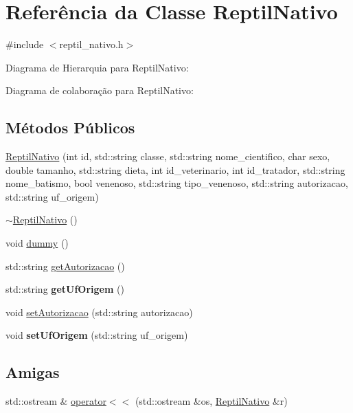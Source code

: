\hypertarget{classReptilNativo}{}\section{Referência da Classe Reptil\+Nativo}
\label{classReptilNativo}


{\ttfamily \#include $<$reptil\+\_\+nativo.\+h$>$}



Diagrama de Hierarquia para Reptil\+Nativo\+:


Diagrama de colaboração para Reptil\+Nativo\+:
\subsection*{Métodos Públicos}
\begin{DoxyCompactItemize}
\item 
\hyperlink{classReptilNativo_ab23dadfa1a143b980b0b0a8d16ff0d05}{Reptil\+Nativo} (int id, std\+::string classe, std\+::string nome\+\_\+cientifico, char sexo, double tamanho, std\+::string dieta, int id\+\_\+veterinario, int id\+\_\+tratador, std\+::string nome\+\_\+batismo, bool venenoso, std\+::string tipo\+\_\+venenoso, std\+::string autorizacao, std\+::string uf\+\_\+origem)
\item 
\hyperlink{classReptilNativo_a6de5838fd62a1c61175e690110cd7dc0}{$\sim$\+Reptil\+Nativo} ()
\item 
void \hyperlink{classReptilNativo_a72582fd1adb5d8d562354ab35e574b3b}{dummy} ()
\item 
std\+::string \hyperlink{classReptilNativo_af3526f4d89e275985983ac6a76e02fc4}{get\+Autorizacao} ()
\item 
\mbox{\label{classReptilNativo_ad4b80b0971aac643e42476292d02a9c1}} 
std\+::string {\bfseries get\+Uf\+Origem} ()
\item 
void \hyperlink{classReptilNativo_a18648a093476229d68a57d45d749d69c}{set\+Autorizacao} (std\+::string autorizacao)
\item 
\mbox{\label{classReptilNativo_a2c49cbeec06abf746fc6f62d8dce49a0}} 
void {\bfseries set\+Uf\+Origem} (std\+::string uf\+\_\+origem)
\end{DoxyCompactItemize}
\subsection*{Amigas}
\begin{DoxyCompactItemize}
\item 
std\+::ostream \& \hyperlink{classReptilNativo_ae9107a41e5f55eee6b5a8acd1c135618}{operator$<$$<$} (std\+::ostream \&os, \hyperlink{classReptilNativo}{Reptil\+Nativo} \&r)
\end{DoxyCompactItemize}
